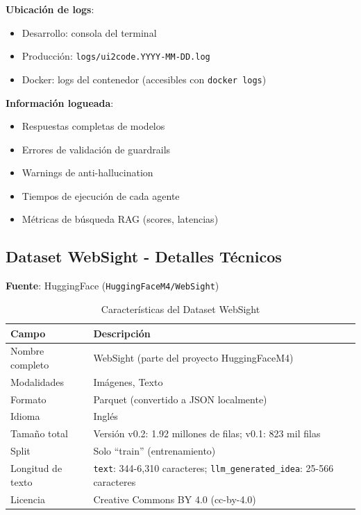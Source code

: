\documentclass[12pt,a4paper]{article}
\begin{document}
\textbf{Ubicación de logs}:
\begin{itemize}
    \item Desarrollo: consola del terminal
    \item Producción: \texttt{logs/ui2code.YYYY-MM-DD.log}
    \item Docker: logs del contenedor (accesibles con \texttt{docker logs})
\end{itemize}

\textbf{Información logueada}:
\begin{itemize}
    \item Respuestas completas de modelos
    \item Errores de validación de guardrails
    \item Warnings de anti-hallucination
    \item Tiempos de ejecución de cada agente
    \item Métricas de búsqueda RAG (scores, latencias)
\end{itemize}

\subsection{Dataset WebSight - Detalles Técnicos}

\textbf{Fuente}: HuggingFace (\texttt{HuggingFaceM4/WebSight})

\begin{table}[H]
\centering
\caption{Características del Dataset WebSight}
\begin{tabular}{lp{10cm}}
\toprule
\textbf{Campo} & \textbf{Descripción} \\
\midrule
Nombre completo & WebSight (parte del proyecto HuggingFaceM4) \\
Modalidades & Imágenes, Texto \\
Formato & Parquet (convertido a JSON localmente) \\
Idioma & Inglés \\
Tamaño total & Versión v0.2: 1.92 millones de filas; v0.1: 823 mil filas \\
Split & Solo ``train'' (entrenamiento) \\
Longitud de texto & \texttt{text}: 344-6,310 caracteres; \texttt{llm\_generated\_idea}: 25-566 caracteres \\
Licencia & Creative Commons BY 4.0 (cc-by-4.0) \\
\bottomrule
\end{tabular}
\end{table}
\end{document}
